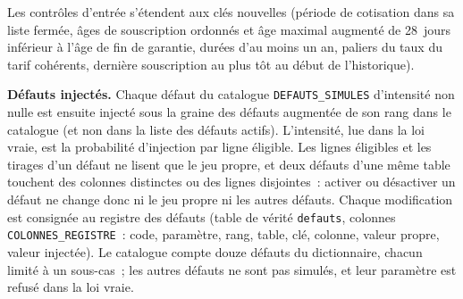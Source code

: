 \documentclass[a4paper,11pt]{article}
\newcommand{\code}[1]{\texttt{\small #1}}
\begin{document}
\noindent Les contrôles d'entrée s'étendent aux clés nouvelles (période de
cotisation dans sa liste fermée, âges de souscription ordonnés et âge
maximal augmenté de 28~jours inférieur à l'âge de fin de garantie, durées
d'au moins un an, paliers du taux du tarif cohérents, dernière souscription
au plus tôt au début de l'historique).

\textbf{Défauts injectés.} Chaque défaut du catalogue
\code{DEFAUTS\_SIMULES} d'intensité non nulle est ensuite injecté sous la
graine des défauts augmentée de son rang dans le catalogue (et non dans la
liste des défauts actifs). L'intensité, lue dans la loi vraie, est la
probabilité d'injection par ligne éligible. Les lignes éligibles et les
tirages d'un défaut ne lisent que le jeu propre, et deux défauts d'une même
table touchent des colonnes distinctes ou des lignes disjointes~: activer
ou désactiver un défaut ne change donc ni le jeu propre ni les autres
défauts. Chaque modification est consignée au registre des défauts (table
de vérité \code{defauts}, colonnes \code{COLONNES\_REGISTRE}~: code,
paramètre, rang, table, clé, colonne, valeur propre, valeur injectée). Le
catalogue compte douze défauts du dictionnaire, chacun limité à un
sous-cas~; les autres défauts ne sont pas simulés, et leur paramètre est
refusé dans la loi vraie.
\end{document}
